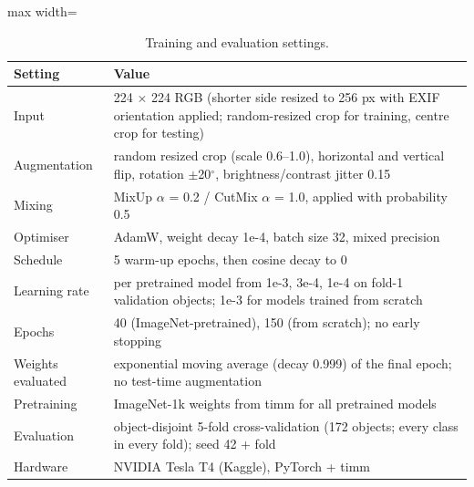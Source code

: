 \begin{table}[!htbp]
\centering
\scriptsize
\caption{Training and evaluation settings.}
\label{tab:s_settings}
\begin{adjustbox}{max width=\textwidth}
\begin{tabular}{@{}p{3.2cm}p{11cm}@{}}
\toprule
Setting & Value \\
\midrule
Input & 224 $\times$ 224 RGB (shorter side resized to 256 px with EXIF orientation applied; random-resized crop for training, centre crop for testing) \\
Augmentation & random resized crop (scale 0.6–1.0), horizontal and vertical flip, rotation $\pm$20$^\circ$, brightness/contrast jitter 0.15 \\
Mixing & MixUp $\alpha$ = 0.2 / CutMix $\alpha$ = 1.0, applied with probability 0.5 \\
Optimiser & AdamW, weight decay 1e-4, batch size 32, mixed precision \\
Schedule & 5 warm-up epochs, then cosine decay to 0 \\
Learning rate & per pretrained model from {1e-3, 3e-4, 1e-4} on fold-1 validation objects; 1e-3 for models trained from scratch \\
Epochs & 40 (ImageNet-pretrained), 150 (from scratch); no early stopping \\
Weights evaluated & exponential moving average (decay 0.999) of the final epoch; no test-time augmentation \\
Pretraining & ImageNet-1k weights from timm for all pretrained models \\
Evaluation & object-disjoint 5-fold cross-validation (172 objects; every class in every fold); seed 42 + fold \\
Hardware & NVIDIA Tesla T4 (Kaggle), PyTorch + timm \\
\bottomrule
\end{tabular}
\end{adjustbox}
\end{table}
